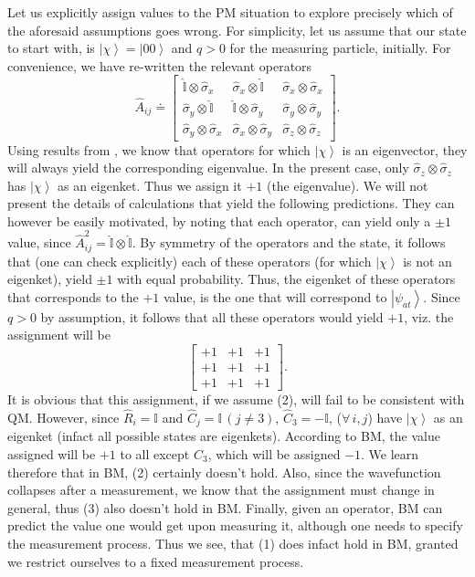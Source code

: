 Let us explicitly assign values to the PM situation to explore precisely
which of the aforesaid assumptions goes wrong. For simplicity, let
us assume that our state to start with, is $\left|\chi\right\rangle =\left|00\right\rangle $
and $q>0$ for the measuring particle, initially. For convenience,
we have re-written the relevant operators 
\[
\hat{A}_{ij}\doteq\left[\begin{array}{ccc}
\hat{\mathbb{I}}\otimes\hat{\sigma}_{x} & \hat{\sigma}_{x}\otimes\hat{\mathbb{I}} & \hat{\sigma}_{x}\otimes\hat{\sigma}_{x}\\
\hat{\sigma}_{y}\otimes\hat{\mathbb{I}} & \hat{\mathbb{I}}\otimes\hat{\sigma}_{y} & \hat{\sigma}_{y}\otimes\hat{\sigma}_{y}\\
\hat{\sigma}_{y}\otimes\hat{\sigma}_{x} & \hat{\sigma}_{x}\otimes\hat{\sigma}_{y} & \hat{\sigma}_{z}\otimes\hat{\sigma}_{z}
\end{array}\right].
\]
Using results from ,
we know that operators for which $\left|\chi\right\rangle $ is an
eigenvector, they will always yield the corresponding eigenvalue.
In the present case, only $\hat{\sigma}_{z}\otimes\hat{\sigma}_{z}$
has $\left|\chi\right\rangle $ as an eigenket. Thus we assign it
$+1$ (the eigenvalue). We will not present the details of calculations
that yield the following predictions. They can however be easily motivated,
by noting that each operator, can yield only a $\pm1$ value, since
$\hat{A}_{ij}^{2}=\hat{\mathbb{I}}\otimes\hat{\mathbb{I}}$. By symmetry
of the operators and the state, it follows that (one can check explicitly)
each of these operators (for which $\left|\chi\right\rangle $ is
not an eigenket), yield $\pm1$ with equal probability. Thus, the
eigenket of these operators that corresponds to the $+1$ value, is
the one that will correspond to $\left|\psi_{at}\right\rangle $.
Since $q>0$ by assumption, it follows that all these operators would
yield $+1$, viz. the assignment will be 
\[
\left[\begin{array}{ccc}
+1 & +1 & +1\\
+1 & +1 & +1\\
+1 & +1 & +1
\end{array}\right].
\]
It is obvious that this assignment, if we assume (2), will fail to
be consistent with QM. However, since $\hat{R}_{i}=\mathbb{I}$ and
$\hat{C}_{j}=\mathbb{I}\,(j\neq3)$, $\hat{C}_{3}=-\mathbb{I}$, ($\forall\,i,j$)
have $\left|\chi\right\rangle $ as an eigenket (infact all possible
states are eigenkets). According to BM, the value assigned will be
$+1$ to all except $C_{3}$, which will be assigned $-1$. We learn
therefore that in BM, (2) certainly doesn't hold. Also, since the
wavefunction collapses after a measurement, we know that the assignment
must change in general, thus (3) also doesn't hold in BM. Finally,
given an operator, BM can predict the value one would get upon measuring
it, although one needs to specify the measurement process. Thus we
see, that (1) does infact hold in BM, granted we restrict ourselves
to a fixed measurement process.


